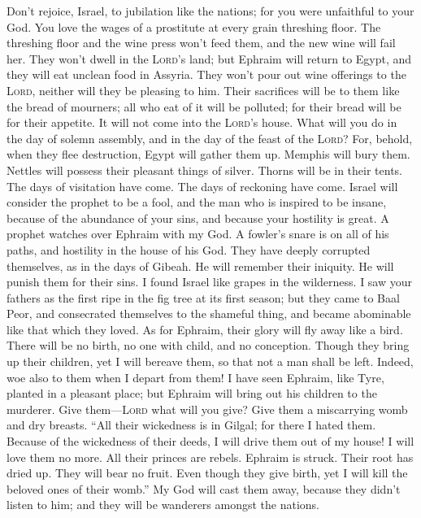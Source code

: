  Don't rejoice, Israel, to jubilation like the nations;
for you were unfaithful to your God. You love the wages of a prostitute
at every grain threshing floor.  The threshing floor and
the wine press won't feed them, and the new wine will fail her.
 They won't dwell in the \textsc{Lord}'s land; but Ephraim
will return to Egypt, and they will eat unclean food in Assyria.
 They won't pour out wine offerings to the \textsc{Lord},
neither will they be pleasing to him. Their sacrifices will be to them
like the bread of mourners; all who eat of it will be polluted; for
their bread will be for their appetite. It will not come into the
\textsc{Lord}'s house.  What will you do in the day of
solemn assembly, and in the day of the feast of the \textsc{Lord}?
 For, behold, when they flee destruction, Egypt will
gather them up. Memphis will bury them. Nettles will possess their
pleasant things of silver. Thorns will be in their tents. 
The days of visitation have come. The days of reckoning have come.
Israel will consider the prophet to be a fool, and the man who is
inspired to be insane, because of the abundance of your sins, and
because your hostility is great.  A prophet watches over
Ephraim with my God. A fowler's snare is on all of his paths, and
hostility in the house of his God.  They have deeply
corrupted themselves, as in the days of Gibeah. He will remember their
iniquity. He will punish them for their sins.  I found
Israel like grapes in the wilderness. I saw your fathers as the first
ripe in the fig tree at its first season; but they came to Baal Peor,
and consecrated themselves to the shameful thing, and became abominable
like that which they loved.  As for Ephraim, their glory
will fly away like a bird. There will be no birth, no one with child,
and no conception.  Though they bring up their children,
yet I will bereave them, so that not a man shall be left. Indeed, woe
also to them when I depart from them!  I have seen
Ephraim, like Tyre, planted in a pleasant place; but Ephraim will bring
out his children to the murderer.  Give
them---\textsc{Lord} what will you give? Give them a miscarrying womb
and dry breasts.  ``All their wickedness is in Gilgal;
for there I hated them. Because of the wickedness of their deeds, I will
drive them out of my house! I will love them no more. All their princes
are rebels.  Ephraim is struck. Their root has dried up.
They will bear no fruit. Even though they give birth, yet I will kill
the beloved ones of their womb.''  My God will cast them
away, because they didn't listen to him; and they will be wanderers
amongst the nations.


